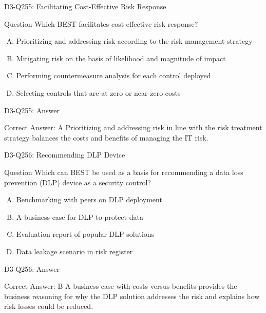 \documentclass{beamer}
\begin{document}
	\begin{frame}{D3-Q255: Facilitating Cost-Effective Risk Response}
		\begin{block}{Question}
			Which BEST facilitates cost-effective risk response?
		\end{block}
		\begin{enumerate}[(A)]
			\item Prioritizing and addressing risk according to the risk management strategy
			\item Mitigating risk on the basis of likelihood and magnitude of impact
			\item Performing countermeasure analysis for each control deployed
			\item Selecting controls that are at zero or near-zero costs
		\end{enumerate}
	\end{frame}
	\begin{frame}{D3-Q255: Answer}
		\begin{block}{Correct Answer: A}
			Prioritizing and addressing risk in line with the risk treatment strategy balances the costs and benefits of managing the IT risk.
		\end{block}
	\end{frame}
	
	\begin{frame}{D3-Q256: Recommending DLP Device}
		\begin{block}{Question}
			Which can BEST be used as a basis for recommending a data loss prevention (DLP) device as a security control?
		\end{block}
		\begin{enumerate}[(A)]
			\item Benchmarking with peers on DLP deployment
			\item A business case for DLP to protect data
			\item Evaluation report of popular DLP solutions
			\item Data leakage scenario in risk register
		\end{enumerate}
	\end{frame}
	\begin{frame}{D3-Q256: Answer}
		\begin{block}{Correct Answer: B}
			A business case with costs versus benefits provides the business reasoning for why the DLP solution addresses the risk and explains how risk losses could be reduced.
		\end{block}
	\end{frame}
	
\end{document}
